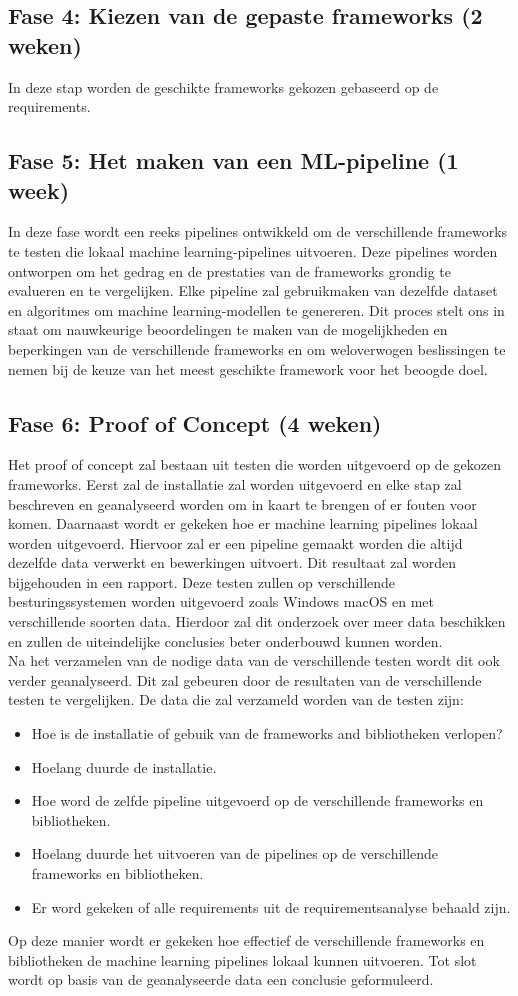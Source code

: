\subsection{Fase 4: Kiezen van de gepaste frameworks (2 weken)}
In deze stap worden de geschikte frameworks gekozen gebaseerd op de requirements.
\subsection{Fase 5: Het maken van een ML-pipeline (1 week)}
In deze fase wordt een reeks pipelines ontwikkeld om de verschillende frameworks te testen die lokaal machine learning-pipelines uitvoeren. Deze pipelines worden ontworpen om het gedrag en de prestaties van de frameworks grondig te evalueren en te vergelijken. Elke pipeline zal gebruikmaken van dezelfde dataset en algoritmes om machine learning-modellen te genereren. Dit proces stelt ons in staat om nauwkeurige beoordelingen te maken van de mogelijkheden en beperkingen van de verschillende frameworks en om weloverwogen beslissingen te nemen bij de keuze van het meest geschikte framework voor het beoogde doel.
\subsection{Fase 6: Proof of Concept (4 weken)}
Het proof of concept zal bestaan uit testen die worden uitgevoerd op de gekozen frameworks. Eerst zal de installatie zal worden uitgevoerd en elke stap zal beschreven en geanalyseerd worden om in kaart te brengen of er fouten voor komen. Daarnaast wordt er gekeken hoe er machine learning pipelines lokaal worden uitgevoerd. Hiervoor zal er een pipeline gemaakt worden die altijd dezelfde data verwerkt en bewerkingen uitvoert. Dit resultaat zal worden bijgehouden in een rapport.
Deze testen zullen op verschillende besturingssystemen worden uitgevoerd zoals Windows macOS en met verschillende soorten data. Hierdoor zal dit onderzoek over meer data beschikken en zullen de uiteindelijke conclusies beter onderbouwd kunnen worden.\\
Na het verzamelen van de nodige data van de verschillende testen wordt dit ook verder geanalyseerd. Dit zal gebeuren door de resultaten van de verschillende testen te vergelijken. 
De data die zal verzameld worden van de testen zijn:
\begin{itemize}
  \item Hoe is de installatie of gebuik van de frameworks and bibliotheken verlopen?
  \item Hoelang duurde de installatie.
  \item Hoe word de zelfde pipeline uitgevoerd op de verschillende frameworks en bibliotheken.
  \item Hoelang duurde het uitvoeren van de pipelines op de verschillende frameworks en bibliotheken.
  \item Er word gekeken of alle requirements uit de requirementsanalyse behaald zijn.
\end{itemize}
Op deze manier wordt er gekeken hoe effectief de verschillende frameworks en bibliotheken de machine learning pipelines lokaal kunnen uitvoeren. Tot slot wordt op basis van de geanalyseerde data een conclusie geformuleerd.\\
